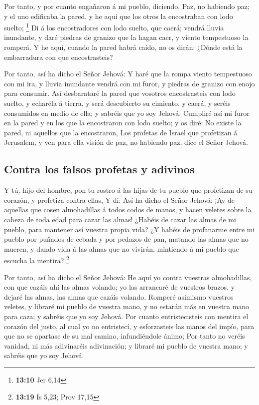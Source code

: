  Por tanto, y por cuanto engañaron á mi pueblo, diciendo,
Paz, no habiendo paz; y el uno edificaba la pared, y he aquí que los
otros la encostraban con lodo suelto; \footnote{\textbf{13:10} Jer 6,14}
 Di á los encostradores con lodo suelto, que caerá;
vendrá lluvia inundante, y daré piedras de granizo que la hagan caer, y
viento tempestuoso la romperá.  Y he aquí, cuando la
pared habrá caído, no os dirán: ¿Dónde está la embarradura con que
encostrasteis?

 Por tanto, así ha dicho el Señor Jehová: Y haré que la
rompa viento tempestuoso con mi ira, y lluvia inundante vendrá con mi
furor, y piedras de granizo con enojo para consumir.  Así
desbarataré la pared que vosotros encostrasteis con lodo suelto, y
echaréla á tierra, y será descubierto su cimiento, y caerá, y seréis
consumidos en medio de ella; y sabréis que yo soy Jehová.
 Cumpliré así mi furor en la pared y en los que la
encostraron con lodo suelto; y os diré: No existe la pared, ni aquellos
que la encostraron,  Los profetas de Israel que
profetizan á Jerusalem, y ven para ella visión de paz, no habiendo paz,
dice el Señor Jehová.

\hypertarget{contra-los-falsos-profetas-y-adivinos}{%
\subsection{Contra los falsos profetas y
adivinos}\label{contra-los-falsos-profetas-y-adivinos}}

 Y tú, hijo del hombre, pon tu rostro á las hijas de tu
pueblo que profetizan de su corazón, y profetiza contra ellas,
 Y di: Así ha dicho el Señor Jehová: ¡Ay de aquellas que
cosen almohadillas á todos codos de manos, y hacen veletes sobre la
cabeza de toda edad para cazar las almas! ¿Habéis de cazar las almas de
mi pueblo, para mantener así vuestra propia vida?  ¿Y
habéis de profanarme entre mi pueblo por puñados de cebada y por pedazos
de pan, matando las almas que no mueren, y dando vida á las almas que no
vivirán, mintiendo á mi pueblo que escucha la mentira? \footnote{\textbf{13:19}
  Is 5,23; Prov 17,15}

 Por tanto, así ha dicho el Señor Jehová: He aquí yo
contra vuestras almohadillas, con que cazáis ahí las almas volando; yo
las arrancaré de vuestros brazos, y dejaré las almas, las almas que
cazáis volando.  Romperé asimismo vuestros veletes, y
libraré mi pueblo de vuestra mano, y no estarán más en vuestra mano para
caza; y sabréis que yo soy Jehová.  Por cuanto
entristecisteis con mentira el corazón del justo, al cual yo no
entristecí, y esforzasteis las manos del impío, para que no se apartase
de su mal camino, infundiéndole ánimo;  Por tanto no
veréis vanidad, ni más adivinaréis adivinación; y libraré mi pueblo de
vuestra mano; y sabréis que yo soy Jehová.

